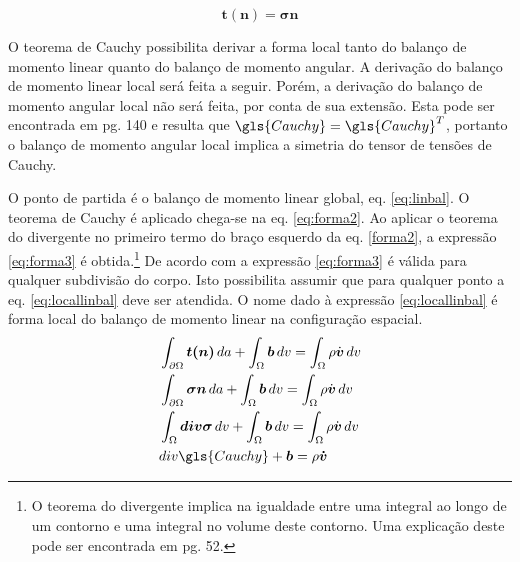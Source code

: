 \begin{equation}
    \boldsymbol{t(n)} = \boldsymbol{\sigma n} \label{eq:CauchyStress}
\end{equation}

O teorema de Cauchy possibilita derivar a forma local tanto do balanço de momento linear quanto do balanço de momento angular. A derivação do balanço de momento linear local será feita a seguir. Porém, a derivação do balanço de momento angular local não será feita, por conta de sua extensão. Esta pode ser encontrada em \cite{gurtin_fried_anand_2013} pg. 140 e resulta que $ \gls{Cauchy} = \gls{Cauchy}^T $, portanto o balanço de momento angular local implica a simetria do tensor de tensões de Cauchy. \par

O ponto de partida é o balanço de momento linear global, eq. \ref{eq:linbal}. O teorema de Cauchy é aplicado chega-se na eq. \ref{eq:forma2}. Ao aplicar o teorema do divergente no primeiro termo do braço esquerdo da eq. \ref{forma2}, a expressão \ref{eq:forma3} é obtida.\footnote{ O teorema do divergente implica na igualdade entre uma integral ao longo de um contorno e uma integral no volume deste contorno. Uma explicação deste pode ser encontrada em \cite{gurtin_fried_anand_2013} pg. 52. } De acordo com \cite{gurtin_fried_anand_2013} a expressão \ref{eq:forma3} é válida para qualquer subdivisão do corpo. Isto possibilita assumir que para qualquer ponto a eq. \ref{eq:locallinbal} deve ser atendida. O nome dado à expressão \ref{eq:locallinbal} é forma local do balanço de momento linear na configuração espacial. 
\begin{align}
    &\int_{\partial \Omega} \boldsymbol{t(n)} \, da + \int_{\Omega} \boldsymbol{b}\, dv = \int_{\Omega} \rho \dot{\boldsymbol{v}} \,dv \\
    &\int_{\partial \Omega} \boldsymbol{\sigma n} \,da + \int_{\Omega} \boldsymbol{b}\, dv = \int_{\Omega} \rho \dot{\boldsymbol{v}} \,dv \label{eq:forma2} \\ 
    &\int_{\Omega} \boldsymbol{div \sigma} \,dv + \int_{\Omega} \boldsymbol{b} \,dv = \int_{\Omega} \rho \dot{\boldsymbol{v}} \,dv  \label{eq:forma3} \\
    &div\gls{Cauchy} + \boldsymbol{b} = \rho \boldsymbol{\dot{v}} \label{eq:locallinbal}
\end{align}
